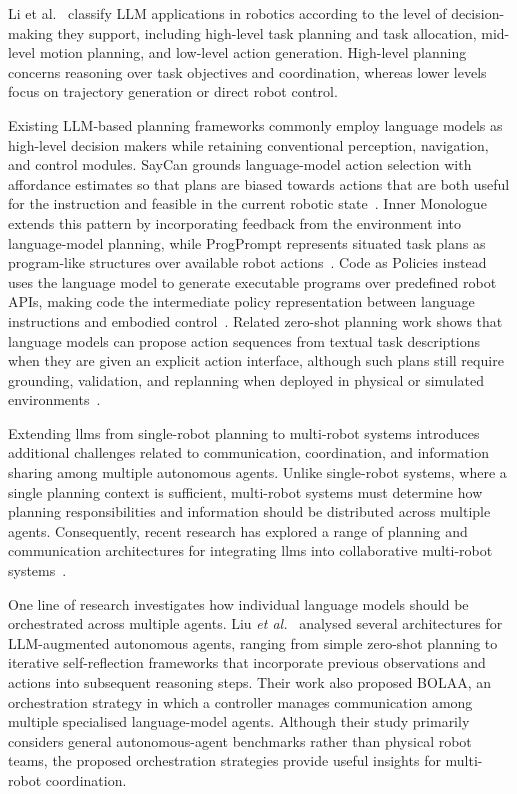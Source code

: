 Li et al.~\cite{li2026largelanguagemodelsmultirobot} classify LLM applications in robotics according to the level of decision-making they support, including high-level task planning and task allocation, mid-level motion planning, and low-level action generation. High-level planning concerns reasoning over task objectives and coordination, whereas lower levels focus on trajectory generation or direct robot control.

Existing LLM-based planning frameworks commonly employ language models as high-level decision makers while retaining conventional perception, navigation, and control modules. SayCan grounds language-model action selection with affordance estimates so that plans are biased towards actions that are both useful for the instruction and feasible in the current robotic state~\cite{ahn2022do}. Inner Monologue extends this pattern by incorporating feedback from the environment into language-model planning, while ProgPrompt represents situated task plans as program-like structures over available robot actions~\cite{huang2022innermonologue,singh2023progprompt}. Code as Policies instead uses the language model to generate executable programs over predefined robot APIs, making code the intermediate policy representation between language instructions and embodied control~\cite{liang2022code}. Related zero-shot planning work shows that language models can propose action sequences from textual task descriptions when they are given an explicit action interface, although such plans still require grounding, validation, and replanning when deployed in physical or simulated environments~\cite{huang2022lmp}.

Extending \glspl{llm} from single-robot planning to multi-robot systems introduces additional challenges related to communication, coordination, and information sharing among multiple autonomous agents. Unlike single-robot systems, where a single planning context is sufficient, multi-robot systems must determine how planning responsibilities and information should be distributed across multiple agents. Consequently, recent research has explored a range of planning and communication architectures for integrating \glspl{llm} into collaborative multi-robot systems~\cite{li2026largelanguagemodelsmultirobot}.

One line of research investigates how individual language models should be orchestrated across multiple agents. Liu \textit{et al.}~\cite{liu2023bolaa} analysed several architectures for LLM-augmented autonomous agents, ranging from simple zero-shot planning to iterative self-reflection frameworks that incorporate previous observations and actions into subsequent reasoning steps. Their work also proposed BOLAA, an orchestration strategy in which a controller manages communication among multiple specialised language-model agents. Although their study primarily considers general autonomous-agent benchmarks rather than physical robot teams, the proposed orchestration strategies provide useful insights for multi-robot coordination.

